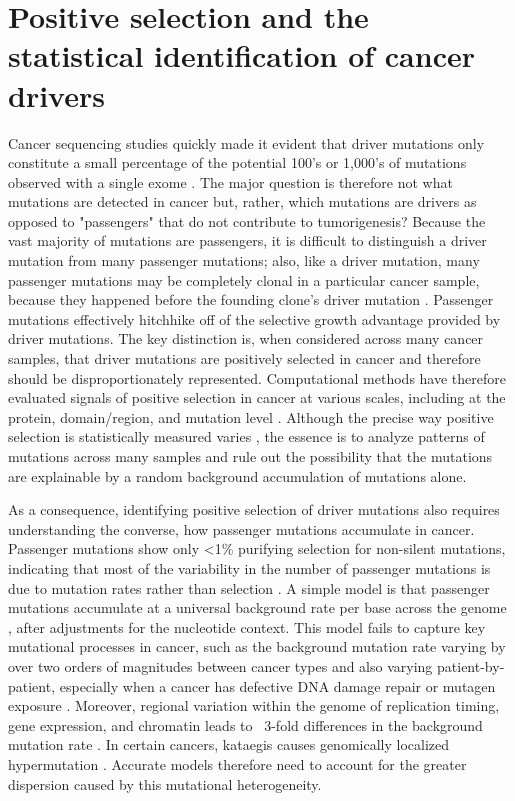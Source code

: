 \section{Positive selection and the statistical identification of cancer drivers}
\label{sec:section}

Cancer sequencing studies quickly made it evident that driver mutations only constitute a small percentage of the potential 100's or 1,000's of mutations observed with a single exome \cite{RN25}. The major question is therefore not what mutations are detected in cancer but, rather, which mutations are drivers as opposed to "passengers" that do not contribute to tumorigenesis? Because the vast majority of mutations are passengers, it is difficult to distinguish a driver mutation from many passenger mutations; also, like a driver mutation, many passenger mutations may be completely clonal in a particular cancer sample, because they happened before the founding clone's driver mutation \cite{RN160, RN50}. Passenger mutations effectively hitchhike off of the selective growth advantage provided by driver mutations. The key distinction is, when considered across many cancer samples, that driver mutations are positively selected in cancer and therefore should be disproportionately represented. Computational methods have therefore evaluated signals of positive selection in cancer at various scales, including at the protein, domain/region, and mutation level \cite{RN52}. Although the precise way positive selection is statistically measured varies \cite{RN49}, the essence is to analyze patterns of mutations across many samples and rule out the possibility that the mutations are explainable by a random background accumulation of mutations alone. 

As a consequence, identifying positive selection of driver mutations also requires understanding the converse, how passenger mutations accumulate in cancer. Passenger mutations show only \textless1\% purifying selection for non-silent mutations, indicating that most of the variability in the number of passenger mutations is due to mutation rates rather than selection \cite{RN56}. A simple model is that passenger mutations accumulate at a universal background rate per base across the genome \cite{RN3}, after adjustments for the nucleotide context. This model fails to capture key mutational processes in cancer, such as the background mutation rate varying by over two orders of magnitudes between cancer types \cite{RN13} and also varying patient-by-patient, especially when a cancer has defective DNA damage repair or mutagen exposure \cite{RN51}. Moreover, regional variation within the genome of replication timing, gene expression, and chromatin leads to ~3-fold differences in the background mutation rate \cite{RN13}. In certain cancers, kataegis causes genomically localized hypermutation \cite{RN164}. Accurate models therefore need to account for the greater dispersion caused by this mutational heterogeneity.

